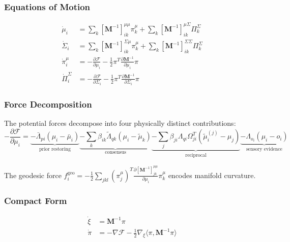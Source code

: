 \documentclass[12pt]{article}
\begin{document}
\subsubsection{Equations of Motion}

\begin{align}
\dot{\mu}_i &= \sum_k [\mathbf{M}^{-1}]_{ik}^{\mu\mu}\pi_k^\mu + \sum_k [\mathbf{M}^{-1}]_{ik}^{\mu\Sigma}\Pi_k^\Sigma \label{eq:hamilton_mu} \\[6pt]
\dot{\Sigma}_i &= \sum_k [\mathbf{M}^{-1}]_{ik}^{\Sigma\mu}\pi_k^\mu + \sum_k [\mathbf{M}^{-1}]_{ik}^{\Sigma\Sigma}\Pi_k^\Sigma \label{eq:hamilton_sigma} \\[6pt]
\dot{\pi}_i^\mu &= -\frac{\partial \mathcal{F}}{\partial \mu_i} - \frac{1}{2}\pi^T\frac{\partial \mathbf{M}^{-1}}{\partial \mu_i}\pi \label{eq:hamilton_pi_mu} \\[6pt]
\dot{\Pi}_i^\Sigma &= -\frac{\partial \mathcal{F}}{\partial \Sigma_i} - \frac{1}{2}\pi^T\frac{\partial \mathbf{M}^{-1}}{\partial \Sigma_i}\pi \label{eq:hamilton_pi_sigma}
\end{align}

\subsubsection{Force Decomposition}

The potential forces decompose into four physically distinct contributions:
\begin{equation}
\boxed{
-\frac{\partial \mathcal{F}}{\partial \mu_i} = \underbrace{-\bar{\Lambda}_{pi}(\mu_i - \bar{\mu}_i)}_{\text{prior restoring}} \underbrace{- \sum_k \beta_{ik}\tilde{\Lambda}_{qk}(\mu_i - \tilde{\mu}_k)}_{\text{consensus}} \underbrace{- \sum_j \beta_{ji}\Lambda_{qi}\Omega_{ji}^T(\tilde{\mu}_i^{(j)} - \mu_j)}_{\text{reciprocal}} \underbrace{- \Lambda_{o_i}(\mu_i - o_i)}_{\text{sensory evidence}}
}
\label{eq:force_decomposition}
\end{equation}

The geodesic force $f_i^{\text{geo}} = -\frac{1}{2}\sum_{jkl}(\pi_j^\mu)^T\frac{\partial[\mathbf{M}^{-1}]_{jk}^{\mu\mu}}{\partial \mu_i}\pi_k^\mu$ encodes manifold curvature.

\subsubsection{Compact Form}

\begin{equation}
\boxed{
\begin{aligned}
\dot{\xi} &= \mathbf{M}^{-1}\pi \\
\dot{\pi} &= -\nabla\mathcal{F} - \frac{1}{2}\nabla_\xi\langle\pi, \mathbf{M}^{-1}\pi\rangle
\end{aligned}
}
\end{equation}
\end{document}
